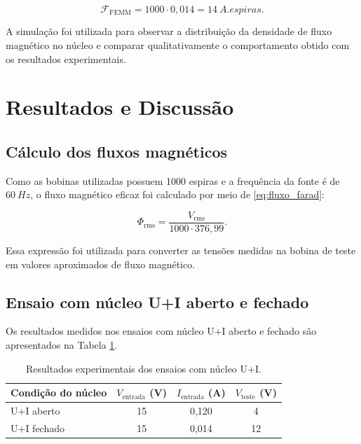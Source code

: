 \documentclass[11pt,a4paper]{article}
\begin{document}
\begin{equation}    
    \mathcal{F}_{\text{FEMM}} = 1000 \cdot 0,014 = \SI{14}{A.espiras}. \label{eq:fmm_femm} 
\end{equation}

A simulação foi utilizada para observar a distribuição da densidade de fluxo magnético no núcleo e comparar qualitativamente o comportamento obtido com os resultados experimentais.

\section{Resultados e Discussão}

\subsection{Cálculo dos fluxos magnéticos}

Como as bobinas utilizadas possuem \num{1000} espiras e a frequência da fonte é de \(\SI{60}{Hz}\), o fluxo magnético eficaz foi calculado por meio de \eqref{eq:fluxo_farad}:

\begin{equation} 
    \Phi_{\text{rms}} = 
    \frac{V_{\text{rms}}}{1000 \cdot 376,99}. 
    \label{eq:fluxo_calculo} 
\end{equation}

Essa expressão foi utilizada para converter as tensões medidas na bobina de teste em valores aproximados de fluxo magnético.

\subsection{Ensaio com núcleo U+I aberto e fechado}

Os resultados medidos nos ensaios com núcleo U+I aberto e fechado são apresentados na Tabela \ref{tab:ui_resultados}.

\begin{table}[H] 
    \centering 
    \caption{Resultados experimentais dos ensaios com núcleo U+I.} \label{tab:ui_resultados} 
    \begin{tabular}{lccc} 
        \toprule Condição do núcleo & \(V_{\text{entrada}}\) (V) & \(I_{\text{entrada}}\) (A) & \(V_{\text{teste}}\) (V) \\ 
        \midrule 
        U+I aberto & 15 & 0,120 & 4 \\ 
        U+I fechado & 15 & 0,014 & 12 \\ 
        \bottomrule 
    \end{tabular} 
\end{table}
\end{document}
